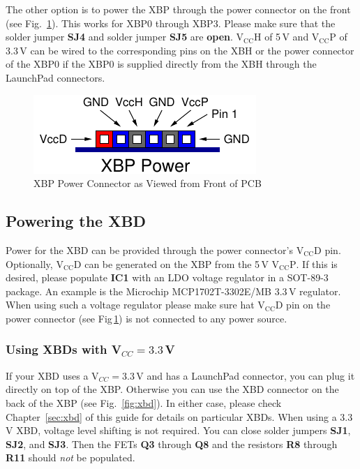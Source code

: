 \documentclass[twoside,11pt]{cergdoc}
\begin{document}
The other option is to power the XBP through the power connector on the front 
(see Fig.~\ref{fig:power}). This works for XBP0 through XBP3. Please make sure that the
solder jumper \textbf{SJ4} and solder jumper \textbf{SJ5} are \textbf{open}. 
$\mathrm{V_{CC}H}$ of 5\,V and $\mathrm{V_{CC}P}$ of 3.3\,V can be wired to the 
corresponding pins on the XBH or the power connector of the XBP0 if the XBP0 is supplied directly from the
XBH through the LaunchPad connectors.


\begin{figure}[ht]
  \begin{center}
    \includegraphics[scale=1]{figures/xbp_power}
    \caption{XBP Power Connector as Viewed from Front of PCB}\label{fig:power}
  \end{center}
\vspace{-1ex}
\end{figure}

\subsection{Powering the XBD}\label{sec:vccd}
Power for the XBD can be provided through the power connector's $\mathrm{V_{CC}D}$ pin.
Optionally, $\mathrm{V_{CC}D}$ can be generated on the XBP from the 5\,V $\mathrm{V_{CC}P}$.
If this is desired, please populate \textbf{IC1} with an LDO voltage regulator in a 
SOT-89-3 package. An example is the Microchip MCP1702T-3302E/MB 3.3\,V regulator.
When using such a voltage
regulator please make sure hat $\mathrm{V_{CC}D}$ pin on the power connector 
(see Fig\,\ref{fig:power}) is not connected to any power source.



\subsubsection{Using XBDs with V$_{CC} = 3.3$\,V}
If your XBD uses a V$_{CC} = 3.3$\,V and has a LaunchPad connector, you can plug it 
directly on top of the XBP. 
Otherwise you can use the XBD connector on the back of the XBP (see Fig.~\ref{fig:xbd}).
In either case, please check Chapter~\ref{sec:xbd} of this guide for details
on particular XBDs. 
When using a 3.3\,V XBD, voltage level shifting is not required. 
You can close solder jumpers \textbf{SJ1}, \textbf{SJ2}, and \textbf{SJ3}. Then
the FETs \textbf{Q3} through \textbf{Q8} and the resistors \textbf{R8} through \textbf{R11} 
should \emph{not} be populated. 
\end{document}
